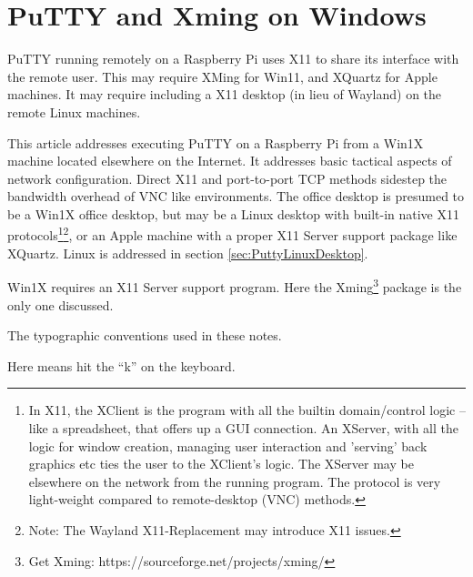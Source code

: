 
\section*{PuTTY and Xming on Windows} \label{sec:puttyxming}
\setcounter{section}{1}

PuTTY running remotely on a Raspberry Pi uses X11 to share its
interface with the remote user. This may require XMing for Win11, and
XQuartz for Apple machines. It may require including a X11 desktop (in
lieu of Wayland) on the remote Linux machines.

This article addresses executing PuTTY on a Raspberry Pi from a Win1X
machine located elsewhere on the Internet. It addresses basic tactical
aspects of network configuration. Direct X11 and port-to-port TCP
methods sidestep the bandwidth overhead of VNC like environments.  The
office desktop is presumed to be a Win1X office desktop, but may be a
Linux desktop with built-in native X11 protocols\footnote{In X11, the
  XClient is the program with all the builtin domain/control logic --
  like a spreadsheet, that offers up a GUI connection. An XServer,
  with all the logic for window creation, managing user interaction
  and 'serving' back graphics etc ties the user to the XClient's
  logic. The XServer may be elsewhere on the network from the running
  program. The protocol is very light-weight compared to
  remote-desktop (VNC) methods.}\footnote{Note: The Wayland
  X11-Replacement may introduce X11 issues.}, or an Apple machine with
a proper X11 Server support package like XQuartz.  Linux is addressed
in section \ref{sec:PuttyLinuxDesktop}.

Win1X requires an X11 Server support program. Here the
Xming\footnote{Get Xming: https://sourceforge.net/projects/xming/} package is the
only one discussed.

The typographic conventions used in these notes.

Here  means hit the ``k'' on the keyboard. 

